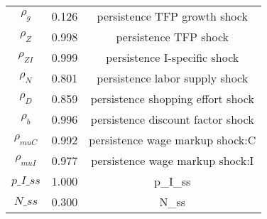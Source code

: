\begin{center}
\begin{longtable}{ccc}
${\rho_g}$ 	 & 	 0.126 	 & 	 persistence TFP growth shock\\
${\rho_Z}$ 	 & 	 0.998 	 & 	 persistence TFP shock\\
${\rho_{ZI}}$ 	 & 	 0.999 	 & 	 persistence I-specific shock\\
${\rho_N}$ 	 & 	 0.801 	 & 	 persistence labor supply shock\\
${\rho_D}$ 	 & 	 0.859 	 & 	 persistence shopping effort shock\\
${\rho_b}$ 	 & 	 0.996 	 & 	 persistence discount factor shock\\
${\rho_{muC}}$ 	 & 	 0.992 	 & 	 persistence wage markup shock:C\\
${\rho_{muI}}$ 	 & 	 0.977 	 & 	 persistence wage markup shock:I\\
$p\_I\_ss$ 	 & 	 1.000 	 & 	 p\_I\_ss\\
$N\_ss$ 	 & 	 0.300 	 & 	 N\_ss\\
\bottomrule%
\end{longtable}
\end{center}
